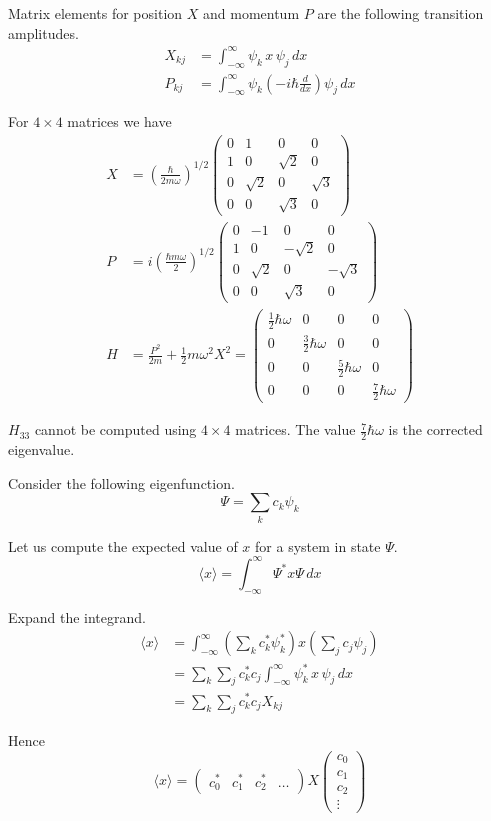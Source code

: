 \documentclass[12pt]{article}
\begin{document}
\noindent
Matrix elements for position $X$ and momentum $P$ are the following transition amplitudes.
\begin{align*}
X_{kj}&=\int_{-\infty}^\infty \psi_k\,x\,\psi_j\,dx
\\[1ex]
P_{kj}&=\int_{-\infty}^\infty \psi_k\left(-i\hbar\frac{d}{dx}\right)\psi_j\,dx
\end{align*}

\noindent
For $4\times4$ matrices we have
\begin{align*}
X&=\left(\frac{\hbar}{2m\omega}\right)^{1/2}
\begin{pmatrix}
0 & 1 & 0 & 0
\\
1 & 0 & \sqrt{2} & 0
\\
0 & \sqrt{2} & 0 & \sqrt{3}
\\
0 & 0 & \sqrt{3} & 0
\end{pmatrix}
\\[1ex]
P&=i\left(\frac{\hbar m\omega}{2}\right)^{1/2}
\begin{pmatrix}
0 & -1 & 0 & 0
\\
1 & 0 & -\sqrt{2} & 0
\\
0 & \sqrt{2} & 0 & -\sqrt{3}
\\
0 & 0 & \sqrt{3} & 0
\end{pmatrix}
\\[1ex]
H&=\frac{P^2}{2m}+\frac{1}{2}m\omega^2 X^2
=\begin{pmatrix}
\tfrac{1}{2}\hbar\omega & 0 & 0 & 0
\\
0 & \tfrac{3}{2}\hbar\omega & 0 & 0
\\
0 & 0 & \tfrac{5}{2}\hbar\omega & 0
\\
0 & 0 & 0 & \tfrac{7}{2}\hbar\omega
\end{pmatrix}
\end{align*}

\noindent
$H_{33}$ cannot be computed using $4\times4$ matrices.
The value $\tfrac{7}{2}\hbar\omega$ is the corrected eigenvalue.

\bigskip
\noindent
Consider the following eigenfunction.
\begin{equation*}
\Psi=\sum_k c_k\psi_k
\end{equation*}

\noindent
Let us compute the expected value of $x$ for a system in state $\Psi$.
\begin{equation*}
\langle x\rangle=\int_{-\infty}^\infty \Psi^* x\Psi\,dx
\end{equation*}

\noindent
Expand the integrand.
\begin{align*}
\langle x\rangle
&=\int_{-\infty}^\infty
\left(\sum_kc_k^*\psi_k^*\right) x \left(\sum_j c_j\psi_j\right)
\\
&=\sum_k\sum_jc_k^*c_j\int_{-\infty}^\infty\psi_k^*\,x\,\psi_j\,dx
\\
&=\sum_k\sum_jc_k^*c_j X_{kj}
\end{align*}

\noindent
Hence
\begin{equation*}
\langle x\rangle=
\begin{pmatrix}c_0^* & c_1^* & c_2^* & \ldots\end{pmatrix}
X
\begin{pmatrix}c_0\\ c_1\\ c_2\\ \vdots\end{pmatrix}
\end{equation*}
\end{document}
